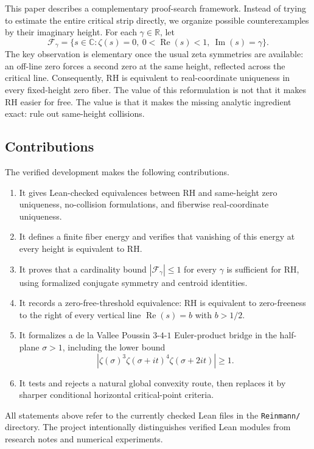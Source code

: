 \documentclass[11pt]{amsart}
\newcommand{\C}{\mathbb{C}}
\newcommand{\R}{\mathbb{R}}
\newcommand{\zetaR}{\zeta}
\newcommand{\re}{\operatorname{Re}}
\newcommand{\im}{\operatorname{Im}}
\newcommand{\fiber}{\mathcal{F}}
\newcommand{\lean}[1]{\texttt{#1}}
\begin{document}
This paper describes a complementary proof-search framework.  Instead of trying
to estimate the entire critical strip directly, we organize possible
counterexamples by their imaginary height.  For each \(\gamma\in\R\), let
\[
  \fiber_\gamma
    = \{s\in\C: \zetaR(s)=0,\ 0<\re(s)<1,\ \im(s)=\gamma\}.
\]
The key observation is elementary once the usual zeta symmetries are available:
an off-line zero forces a second zero at the same height, reflected across the
critical line.  Consequently, RH is equivalent to real-coordinate uniqueness in
every fixed-height zero fiber.  The value of this reformulation is not that it
makes RH easier for free.  The value is that it makes the missing analytic
ingredient exact: rule out same-height collisions.

\subsection*{Contributions}

The verified development makes the following contributions.

\begin{enumerate}[label=(\roman*)]
  \item It gives Lean-checked equivalences between RH and same-height zero
  uniqueness, no-collision formulations, and fiberwise real-coordinate
  uniqueness.
  \item It defines a finite fiber energy and verifies that vanishing of this
  energy at every height is equivalent to RH.
  \item It proves that a cardinality bound \(|\fiber_\gamma|\leq 1\) for every
  \(\gamma\) is sufficient for RH, using formalized conjugate symmetry and
  centroid identities.
  \item It records a zero-free-threshold equivalence: RH is equivalent to
  zero-freeness to the right of every vertical line \(\re(s)=b\) with
  \(b>1/2\).
  \item It formalizes a de la Vallee Poussin \(3\)-\(4\)-\(1\) Euler-product
  bridge in the half-plane \(\sigma>1\), including the lower bound
  \[
    |\zeta(\sigma)^3\zeta(\sigma+it)^4\zeta(\sigma+2it)|\geq 1.
  \]
  \item It tests and rejects a natural global convexity route, then replaces it
  by sharper conditional horizontal critical-point criteria.
\end{enumerate}

All statements above refer to the currently checked Lean files in the
\lean{Reinmann/} directory.  The project intentionally distinguishes verified
Lean modules from research notes and numerical experiments.
\end{document}
